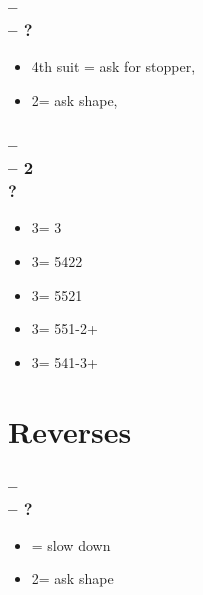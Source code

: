 \documentclass[12pt, a4paper]{report}
\begin{document}
{{{            \subsubsection*{ --  \\  -- ?}
            \begin{itemize}
                \item 4th suit = ask for stopper, \gf
                \item 2\nt = ask shape, \gf
            \end{itemize}

            \subsubsection*{ --  \\  -- 2\nt \\ ?}
            \begin{itemize}
                \item 3\clubs = 3
                \item 3\diams = 5422
                \item 3\hearts = 5521
                \item 3\spades = 551-2+
                \item 3\nt = 541-3+
            \end{itemize}
        }

        \section*{\colorbox{blue!30}{Reverses}}
         {
            \subsubsection*{ --  \\ 
                             -- ?}
            \begin{itemize}
                \item {} = slow down
                \item 2\nt = ask shape
            \end{itemize}

}}}
\end{document}
